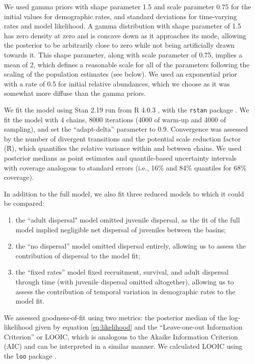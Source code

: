 \documentclass[11pt]{article}
\begin{document}
We used gamma priors with shape parameter 1.5 and scale parameter 0.75
for the initial values for demographic rates,
and standard deviations for time-varying rates and model likelihood.
A gamma distribution with shape parameter of 1.5 has zero density at zero
and is concave down as it approaches its mode,
allowing the posterior to be arbitrarily close to zero
while not being artificially drawn towards it.
This shape parameter, along with scale parameter of 0.75,
implies a mean of 2,
which defines a reasonable scale for all of the parameters
following the scaling of the population estimates (see below).
We used an exponential prior with a rate of 0.5 for initial relative abundances,
which we choose as it was somewhat more diffuse than the gamma priors.

We fit the model using Stan 2.19 \citep{carpenter2017}
run from R 4.0.3 \citep{r2020}, with the \texttt{rstan} package \citep{Stan2018}.
We fit the model with 4 chains,
8000 iterations (4000 of warm-up and 4000 of sampling),
and set the ``adapt-delta'' parameter to 0.9.
Convergence was assessed by the number of divergent transitions
and the potential scale reduction factor (\^{R}),
which quantifies the relative variance within and between chains.
We used posterior medians as point estimates
and quantile-based uncertainty intervals
with coverage analogous to standard errors
(i.e., 16\% and 84\% quantiles for 68\% coverage).

In addition to the full model,
we also fit three reduced models to which it could be compared:
%
\begin{enumerate}[label=(\arabic*)]
\item
the ``adult dispersal" model omitted juvenile dispersal,
as the fit of the full model implied negligible net dispersal of juveniles between the basins;
%
\item
the ``no dispersal'' model omitted dispersal entirely,
allowing us to assess the contribution of dispersal to the model fit;
%
\item
the ``fixed rates'' model fixed recruitment, survival, and adult dispersal through time
(with juvenile dispersal omitted altogether),
allowing us to assess the contribution of temporal variation in demographic rates
to the model fit.
\end{enumerate}
%
We assessed goodness-of-fit using two metrics:
the posterior median of the log-likelihood given by equation \ref{eq:likelihood}
and the ``Leave-one-out Information Criterion'' or LOOIC,
which is analogous to the Akaike Information Criterion (AIC)
and can be interpreted in a similar manner.
We calculated LOOIC using the \texttt{loo} package \citep{vehtari2020}.
\end{document}
